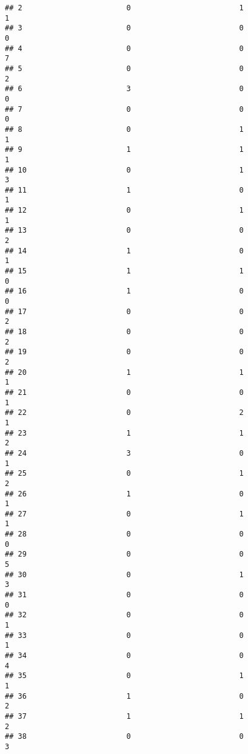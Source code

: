 \documentclass[
]{article}
\begin{document}
\begin{verbatim}
## 2                        0                         1               1
## 3                        0                         0               0
## 4                        0                         0               7
## 5                        0                         0               2
## 6                        3                         0               0
## 7                        0                         0               0
## 8                        0                         1               1
## 9                        1                         1               1
## 10                       0                         1               3
## 11                       1                         0               1
## 12                       0                         1               1
## 13                       0                         0               2
## 14                       1                         0               1
## 15                       1                         1               0
## 16                       1                         0               0
## 17                       0                         0               2
## 18                       0                         0               2
## 19                       0                         0               2
## 20                       1                         1               1
## 21                       0                         0               1
## 22                       0                         2               1
## 23                       1                         1               2
## 24                       3                         0               1
## 25                       0                         1               2
## 26                       1                         0               1
## 27                       0                         1               1
## 28                       0                         0               0
## 29                       0                         0               5
## 30                       0                         1               3
## 31                       0                         0               0
## 32                       0                         0               1
## 33                       0                         0               1
## 34                       0                         0               4
## 35                       0                         1               1
## 36                       1                         0               2
## 37                       1                         1               2
## 38                       0                         0               3

\end{verbatim}
\end{document}
